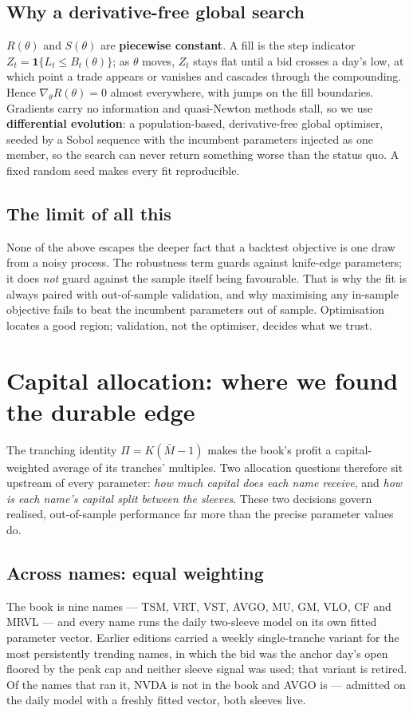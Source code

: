 \documentclass[11pt]{article}
\begin{document}
\subsection{Why a derivative-free global search}
$R(\theta)$ and $S(\theta)$ are \textbf{piecewise constant}. A fill is the step indicator
$Z_t=\mathbf 1\{L_t\le B_t(\theta)\}$; as $\theta$ moves, $Z_t$ stays flat until a bid crosses a
day's low, at which point a trade appears or vanishes and cascades through the compounding. Hence
$\nabla_\theta R(\theta)=0$ almost everywhere, with jumps on the fill boundaries. Gradients carry
no information and quasi-Newton methods stall, so we use \textbf{differential evolution}: a
population-based, derivative-free global optimiser, seeded by a Sobol sequence with the incumbent
parameters injected as one member, so the search can never return something worse than the status
quo. A fixed random seed makes every fit reproducible.

\subsection{The limit of all this}
None of the above escapes the deeper fact that a backtest objective is one draw from a noisy
process. The robustness term guards against knife-edge parameters; it does \emph{not} guard
against the sample itself being favourable. That is why the fit is always paired with
out-of-sample validation, and why maximising any in-sample objective fails to beat the incumbent
parameters out of sample. Optimisation locates a good region; validation, not the optimiser,
decides what we trust.

\section{Capital allocation: where we found the durable edge}\label{sec:alloc}

The tranching identity $\Pi=K(\bar M-1)$ makes the book's profit a capital-weighted average of
its tranches' multiples. Two allocation questions therefore sit upstream of every parameter:
\emph{how much capital does each name receive}, and \emph{how is each name's capital split
between the sleeves}. These two decisions govern realised, out-of-sample performance far more
than the precise parameter values do.

\subsection{Across names: equal weighting}
The book is nine names --- TSM, VRT, VST, AVGO, MU, GM, VLO, CF and MRVL --- and every name runs
the daily two-sleeve model on its own fitted parameter vector. Earlier editions carried a weekly
single-tranche variant for the most persistently trending names, in which the bid was the anchor
day's open floored by the peak cap and neither sleeve signal was used; that variant is retired.
Of the names that ran it, NVDA is not in the book and AVGO is --- admitted on the daily model
with a freshly fitted vector, both sleeves live.
\end{document}
